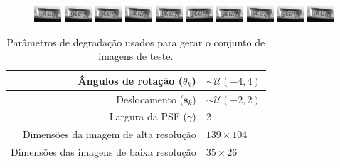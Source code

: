 \begin{figure}[H]
	\includegraphics{figures/degradedImg2/result-10.png}
	\includegraphics{figures/degradedImg2/result-11.png}
	\includegraphics{figures/degradedImg2/result-12.png}
	\includegraphics{figures/degradedImg2/result-13.png}
	\includegraphics{figures/degradedImg2/result-14.png}
	\includegraphics{figures/degradedImg2/result-15.png}
	\includegraphics{figures/degradedImg2/result-16.png}
	\includegraphics{figures/degradedImg2/result-17.png}
	\includegraphics{figures/degradedImg2/result-18.png}
	\includegraphics{figures/degradedImg2/result-19.png}
	
\end{figure}

\begin{table}[h]
	\centering
	\caption{Parâmetros de degradação usados para gerar o conjunto de imagens de teste.}
	\label{tab:resumoParametros}
	\begin{tabular}{r | l}
		Ângulos de rotação ($\theta_k$) & $ \sim \mathcal{U}(-4, 4)$ \\ \hline
		Deslocamento ($\mathbf{s}_k$)& $\sim \mathcal{U}(-2,2)$\\ \hline
		Largura da PSF ($\gamma$) & 2 \\ \hline
		Dimensões da imagem de alta resolução & $139 \times 104$ \\ \hline
		Dimensões das imagens de baixa resolução & $35 \times 26$ \\

	\end{tabular}
\end{table}

